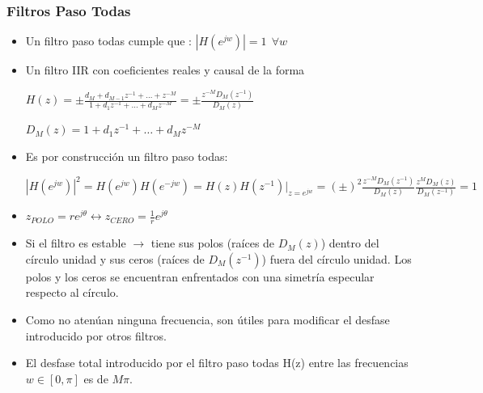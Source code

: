 \documentclass[handout]{beamer}
\numberwithin{section}{part}
\begin{document}
  
\begin{frame}
  \frametitle{Filtros Paso Todas}    
    \vspace{-0.2cm}    
    \begin{itemize}
      \footnotesize
      \item Un filtro paso todas cumple que : $|H(e^{jw})|=1 \:\: \forall w$    
      \item Un filtro IIR con coeficientes reales y causal de la forma
      
      $H(z)=\pm \frac{d_M + d_{M-1}z^{-1}+\dots+ z^{-M}}{1+d_1z^{-1}+\dots+ d_M z^{-M}}=\pm \frac{z^{-M}D_M(z^{-1})}{D_M(z)}$
      
      \hspace{4cm}$D_M(z)=1+d_1 z^{-1}+\dots + d_M z^{-M}$    
      \item Es por construcción un filtro paso todas:
      
      $|H(e^{jw})|^2\!=\!H(e^{jw})H(e^{-jw})\!=\!H(z)H(z^{-1})|_{z=e^{jw}}\!=\!(\pm)^2 \frac{z^{-M}D_M(z^{-1})}{D_M(z)} \frac{z^{M}D_M(z)}{D_M(z^{-1})}=1$    
      \item $z_{POLO}=re^{j\theta}  \leftrightarrow z_{CERO}=\frac{1}{r}e^{j\theta}$
      
      \item Si el filtro es estable $\rightarrow$ tiene sus polos (raíces de $D_M(z)$) dentro del círculo unidad y sus ceros (raíces de $D_M(z^{-1})$) fuera del círculo unidad. Los polos y los ceros se encuentran enfrentados con una simetría especular respecto al círculo.
      
      \item Como no atenúan ninguna frecuencia, son útiles para modificar el desfase introducido por otros filtros. 
      
      \item El desfase total introducido por el filtro paso todas H(z) entre las frecuencias $w\in[0 ,\pi]$ es de $M\pi$. 
    \end{itemize}
\end{frame}
  
\end{document}
